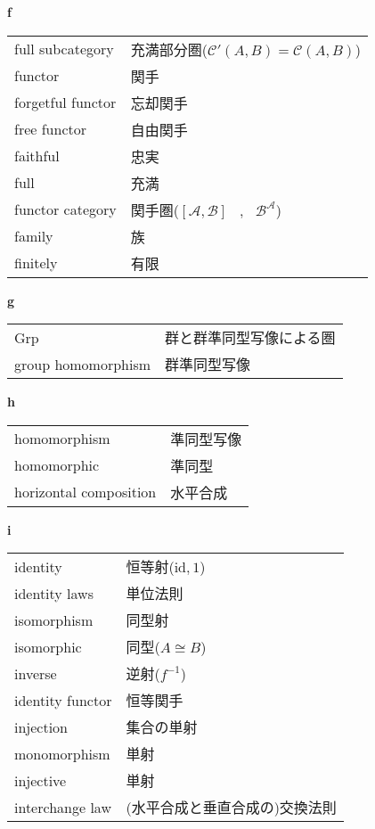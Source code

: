 \documentclass[dvipdfmx]{jsarticle}
\begin{document}
\textbf{f}

  \begin{tabular}{ll}
    full subcategory & 充満部分圏($\mathscr{C}'(A,B) = \mathscr{C}(A,B)$) \\
    functor & 関手 \\
    forgetful functor & 忘却関手 \\
    free functor & 自由関手 \\
    faithful & 忠実 \\
    full & 充満 \\
    functor category & 関手圏($[\mathscr{A},\mathscr{B}]$ \, , \, $\mathscr{B^{\mathscr{A}}}$) \\
    family & 族 \\
    finitely & 有限 \\
  \end{tabular}

\textbf{g}

  \begin{tabular}{ll}
    Grp & 群と群準同型写像による圏 \\
    group homomorphism & 群準同型写像 \\
  \end{tabular}

\textbf{h}

  \begin{tabular}{ll}
    homomorphism & 準同型写像 \\
    homomorphic & 準同型 \\
    horizontal composition & 水平合成 \\
  \end{tabular}

\textbf{i}

  \begin{tabular}{ll}
    identity & 恒等射($\mathrm{id},1$) \\
    identity laws & 単位法則 \\
    isomorphism & 同型射 \\
    isomorphic & 同型($A \cong B$) \\
    inverse & 逆射($f^{-1}$) \\
    identity functor & 恒等関手 \\
    injection & 集合の単射 \\
    monomorphism & 単射 \\
    injective & 単射 \\
    interchange law & (水平合成と垂直合成の)交換法則 \\
  \end{tabular}
\end{document}
